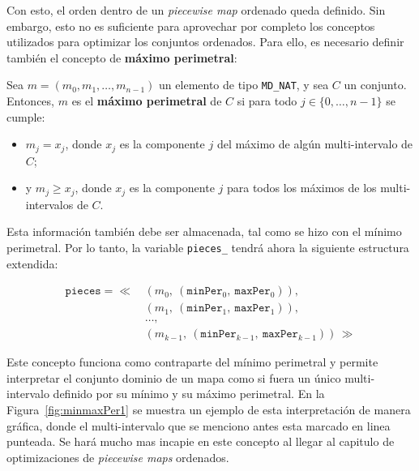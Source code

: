 Con esto, el orden dentro de un \textit{piecewise map} ordenado queda definido. Sin embargo, esto no es suficiente para aprovechar por completo los conceptos utilizados para optimizar los conjuntos ordenados. Para ello, es necesario definir también el concepto de \textbf{máximo perimetral}:

\begin{center}
Sea $m = (m_0, m_1, \dots, m_{n-1})$ un elemento de tipo \texttt{MD\_NAT}, y sea $C$ un conjunto. \\
Entonces, $m$ es el \textbf{máximo perimetral} de $C$ si para todo $j \in \{0, \dots, n-1\}$ se cumple:

\begin{itemize}
    \item $m_j = x_j$, donde $x_j$ es la componente $j$ del máximo de algún multi-intervalo de $C$;
    \item y $m_j \geq x_j$, donde $x_j$ es la componente $j$ para todos los máximos de los multi-intervalos de $C$.
\end{itemize}
\end{center}

Esta información también debe ser almacenada, tal como se hizo con el mínimo perimetral. Por lo tanto, la variable \texttt{pieces\_} tendrá ahora la siguiente estructura extendida:


\begin{align*}
\texttt{pieces} = \ll \, 
  & (m_0,\ (\texttt{minPer}_0,\ \texttt{maxPer}_0)), \\
  & (m_1,\ (\texttt{minPer}_1,\ \texttt{maxPer}_1)), \\
  & \dots, \\
  & (m_{k-1},\ (\texttt{minPer}_{k-1},\ \texttt{maxPer}_{k-1})) \,\gg
\end{align*}



Este concepto funciona como contraparte del mínimo perimetral y permite interpretar el conjunto dominio de un mapa como si fuera un único multi-intervalo definido por su mínimo y su máximo perimetral. En la Figura~\ref{fig:minmaxPer1} se muestra un ejemplo de esta interpretación de manera gráfica, donde el multi-intervalo que se menciono antes esta marcado en linea punteada. Se hará mucho mas incapie en este concepto al llegar al capitulo de optimizaciones de \textit{piecewise maps} ordenados.

